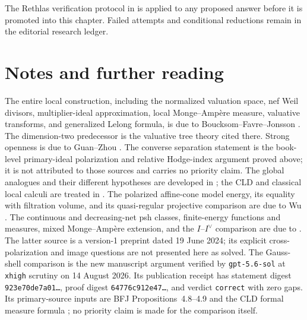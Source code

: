 The Rethlas verification protocol in
 is applied to any proposed answer before it
is promoted into this chapter.  Failed attempts and conditional reductions
remain in the editorial research ledger.

\section*{Notes and further reading}

The entire local construction, including the normalized valuation space,
nef Weil divisors, multiplier-ideal approximation, local Monge--Amp\`ere
measure, valuative transforms, and generalized Lelong formula, is due to
Boucksom--Favre--Jonsson \cite{BFJ08}.  The dimension-two predecessor is the
valuative tree theory cited there.  Strong openness is due to Guan--Zhou
\cite{GZ15}.  The converse separation statement
 is the book-level
primary-ideal polarization and relative Hodge-index argument proved above;
it is not attributed to those sources and carries no priority claim.  The
global analogues and their different hypotheses are
developed in ; the CLD
and classical local calculi are treated in
.  The
polarized affine-cone model energy, its equality with filtration volume, and
its quasi-regular projective comparison are due to Wu
\cite{Wu22AffineEnergy}.  The continuous and decreasing-net psh classes,
finite-energy functions and measures, mixed Monge--Amp\`ere extension, and
the $I$--$I^\vee$ comparison are due to
\cite{Wu24AffineCones}.  The latter source is a version-1 preprint dated
19 June 2024; its explicit cross-polarization and image questions are not
presented here as solved.  The
Gauss-shell comparison is the new manuscript argument verified by
\texttt{gpt-5.6-sol} at \texttt{xhigh} scrutiny on 14 August 2026. Its
publication receipt has statement digest
\texttt{923e70de7a01\ldots}, proof digest
\texttt{64776c912e47\ldots}, and verdict \texttt{correct} with zero gaps.
Its primary-source inputs are BFJ Propositions~4.8--4.9 and the CLD formal
measure formula \cite[Theorem~18.5.5 and Proposition~18.5.8]{CLD25}; no
priority claim is made for the comparison itself.
